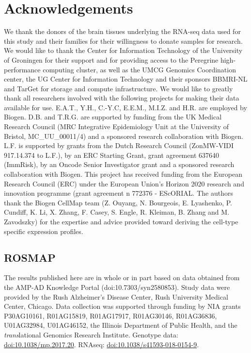 \section*{Acknowledgements}
We thank the donors of the brain tissues underlying the RNA-seq data used for this study and their families for their willingness to donate samples for research. We would like to thank the Center for Information Technology of the University of Groningen for their support and for providing access to the Peregrine high-performance computing cluster, as well as the UMCG Genomics Coordination center, the UG Center for Information Technology and their sponsors BBMRI-NL and TarGet for storage and compute infrastructure. We would like to greatly thank all researchers involved with the following projects for making their data available for use. E.A.T., Y.H., C.-Y.C, E.E.M., M.I.Z. and H.R. are employed by Biogen. D.B. and T.R.G. are supported by funding from the UK Medical Research Council (MRC Integrative Epidemiology Unit at the University of Bristol, MC\_UU\_00011/4) and a sponsored research collaboration with Biogen. L.F. is supported by grants from the Dutch Research Council (ZonMW-VIDI 917.14.374 to L.F.), by an ERC Starting Grant, grant agreement 637640 (ImmRisk), by an Oncode Senior Investigator grant and a sponsored research collaboration with Biogen. This project has received funding from the European Research Council (ERC) under the European Union's Horizon 2020 research and innovation programme (grant agreement n 772376 - EScORIAL. The authors thank the Biogen CellMap team (Z. Ouyang, N. Bourgeois, E. Lyashenko, P. Cundiff, K. Li, X. Zhang, F. Casey, S. Engle, R. Kleiman, B. Zhang and M. Zavodszky) for the expertise and advice provided toward deriving the cell-type specific expression profiles. 

\subsection*{ROSMAP}

The results published here are in whole or in part based on data obtained from the AMP-AD Knowledge Portal (doi:10.7303/syn2580853). Study data were provided by the Rush Alzheimer’s Disease Center, Rush University Medical Center, Chicago. Data collection was supported through funding by NIA grants P30AG10161, R01AG15819, R01AG17917, R01AG30146, R01AG36836, U01AG32984, U01AG46152, the Illinois Department of Public Health, and the \textit{trans}lational Genomics Research Institute. 
Genotype data: \url{doi:10.1038/mp.2017.20}. RNAseq: \url{doi:10.1038/s41593-018-0154-9}.  

